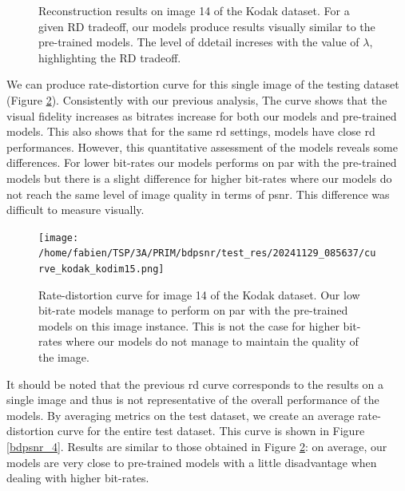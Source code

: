 \begin{figure}[H]
    \centering
    \caption{Reconstruction results on image 14 of the Kodak dataset. For a given \acrshort{RD} tradeoff, our models produce results visually similar to the pre-trained models. The level of ddetail increses with the value of \(\lambda\), highlighting the \acrshort{RD} tradeoff.}
    \label{bdpsnr_1}
\end{figure}

We can produce rate-distortion curve for this single image of the testing dataset (Figure \ref{bdpsnr_3}). Consistently with our previous analysis, The curve shows that the visual fidelity increases as bitrates increase for both our models and pre-trained models. This also shows that for the same \acrshort{rd} settings, models have close \acrshort{rd} performances. However, this quantitative assessment of the models reveals some differences. For lower bit-rates our models performs on par with the pre-trained models but there is a slight difference for higher bit-rates where our models do not reach the same level of image quality in terms of \acrshort{psnr}. This difference was difficult to measure visually.

\begin{figure}
    \centering
    \texttt{[image: /home/fabien/TSP/3A/PRIM/bdpsnr/test\_res/20241129\_085637/curve\_kodak\_kodim15.png]}
    \caption{Rate-distortion curve for image 14 of the Kodak dataset. Our low bit-rate models manage to perform on par with the pre-trained models on this image instance. This is not the case for higher bit-rates where our models do not manage to maintain the quality of the image.}
    \label{bdpsnr_3}
\end{figure}

It should be noted that the previous \acrshort{rd} curve corresponds to the results on a single image and thus is not representative of the overall performance of the models. By averaging metrics on the test dataset, we create an average rate-distortion curve for the entire test dataset. This curve is shown in Figure \ref{bdpsnr_4}. Results are similar to those obtained in Figure \ref{bdpsnr_3}: on average, our models are very close to pre-trained models with a little disadvantage when dealing with higher bit-rates.

